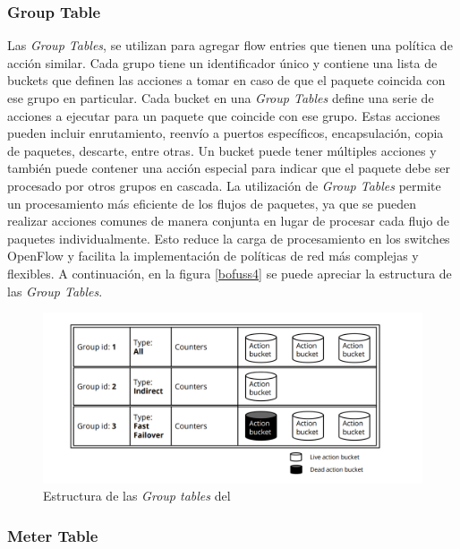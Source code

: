 \subsubsection{Group Table}

Las \textit{Group Tables}, se utilizan para agregar flow entries que tienen una política de acción similar. Cada grupo tiene un identificador único y contiene una lista de buckets que definen las acciones a tomar en caso de que el paquete coincida con ese grupo en particular. Cada bucket en una \textit{Group Tables} define una serie de acciones a ejecutar para un paquete que coincide con ese grupo. Estas acciones pueden incluir enrutamiento, reenvío a puertos específicos, encapsulación, copia de paquetes, descarte, entre otras. Un bucket puede tener múltiples acciones y también puede contener una acción especial para indicar que el paquete debe ser procesado por otros grupos en cascada. La utilización de \textit{Group Tables} permite un procesamiento más eficiente de los flujos de paquetes, ya que se pueden realizar acciones comunes de manera conjunta en lugar de procesar cada flujo de paquetes individualmente. Esto reduce la carga de procesamiento en los switches OpenFlow y facilita la implementación de políticas de red más complejas y flexibles. A continuación, en la figura \ref{bofuss4} se puede apreciar la estructura de las \textit{Group Tables}.

\begin{figure}[ht]
    \centering
    \includegraphics[width=\textwidth]{archivos/img/teoria/bofuss4.png}
    \caption{Estructura de las \textit{Group tables} del  \cite{fernandes2015software}}
    \label{fig:bofuss4}
\end{figure}


\subsubsection{Meter Table}

